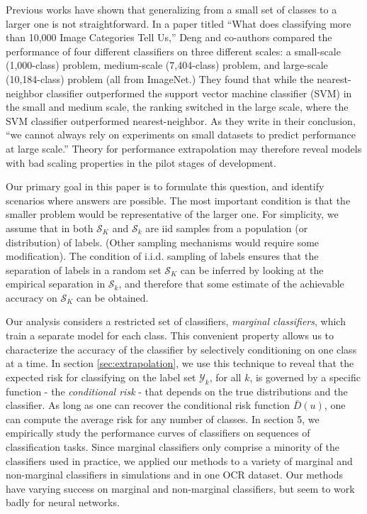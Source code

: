 \documentclass[12pt]{article}
\begin{document}
Previous works have shown that generalizing from a small set of classes 
to a larger one is not straightforward. In a paper titled ``What
does classifying more than 10,000 Image Categories Tell Us,'' Deng and
co-authors compared the performance of four different classifiers on
three different scales: a small-scale (1,000-class) problem,
medium-scale (7,404-class) problem, and large-scale (10,184-class)
problem (all from ImageNet.)  They found that while the
nearest-neighbor classifier outperformed the support vector machine
classifier (SVM) in the small and medium scale, the ranking switched
in the large scale, where the SVM classifier outperformed
nearest-neighbor.  As they write in their conclusion, ``we cannot
always rely on experiments on small datasets to predict performance at
large scale.'' Theory for performance
extrapolation may therefore reveal models with bad scaling properties in the
pilot stages of development.

Our primary goal in this paper is to formulate this question, and
identify scenarios where answers are possible. 
The most important condition is that the smaller problem would be 
representative of the larger one. For simplicity, we
assume that in both $\mathcal{S}_K$ and $\mathcal{S}_k$ are iid samples
from a population (or distribution) of labels. (Other sampling 
mechanisms would require some modification). 
The condition of i.i.d. sampling of labels ensures that the
separation of labels in a random set $\mathcal{S}_K$ can be inferred by
looking at the empirical separation in $\mathcal{S}_k$, and
therefore that some estimate of the achievable accuracy on
$\mathcal{S}_K$ can be obtained.

Our analysis considers a restricted set of classifiers,
\emph{marginal classifiers}, which train a separate model for each class. 
This convenient property allows us to
characterize the accuracy of the classifier by selectively
conditioning on one class at a time.  In section \ref{sec:extrapolation}, we use this
technique to reveal that the expected risk for classifying on the
label set $\mathcal{Y}_k$, for all $k$, is governed by a
specific function - the \emph{conditional risk} -  
that depends on the true distributions and the classifier. 
As long as one can recover the conditional risk
function $\bar{D}(u)$, one can compute the average risk for any number
of classes. 
  In section 5, we
empirically study the performance curves of classifiers on sequences
of classification tasks.  Since marginal classifiers only comprise a
minority of the classifiers used in practice, we applied our methods
to a variety of marginal and non-marginal classifiers in
simulations and in one OCR dataset.  Our methods have varying success
on marginal and non-marginal classifiers, but seem to work badly
for neural networks.
\newline
\end{document}
